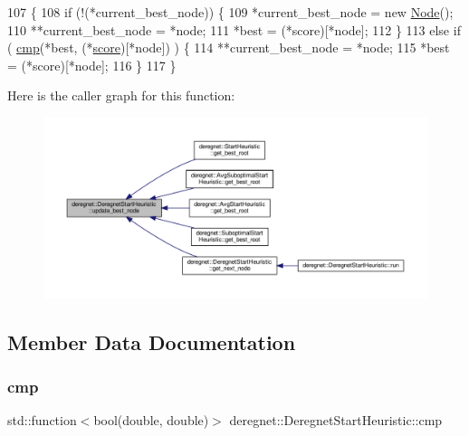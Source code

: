 \begin{DoxyCode}
107                                                             \{
108     \textcolor{keywordflow}{if} (!(*current\_best\_node)) \{
109         *current\_best\_node = \textcolor{keyword}{new} \hyperlink{namespacederegnet_a744bad34f2de9856d36715a445f027f3}{Node}();
110         **current\_best\_node = *node;
111         *best = (*score)[*node];
112     \}
113     \textcolor{keywordflow}{else} \textcolor{keywordflow}{if} ( \hyperlink{classderegnet_1_1DeregnetStartHeuristic_aa5af4d29e3b276c0046c997c16cca3a1}{cmp}(*best, (*\hyperlink{classderegnet_1_1DeregnetStartHeuristic_ae03300e79482975e98f95cba19ad32b0}{score})[*node]) ) \{
114         **current\_best\_node = *node;
115         *best = (*score)[*node];
116     \}
117 \}
\end{DoxyCode}
Here is the caller graph for this function\+:\nopagebreak
\begin{figure}[H]
\begin{center}
\leavevmode
\includegraphics[width=350pt]{classderegnet_1_1DeregnetStartHeuristic_a50179ff9db4d416b93ff41d1dcee1358_icgraph}
\end{center}
\end{figure}


\subsection{Member Data Documentation}
\mbox{\label{classderegnet_1_1DeregnetStartHeuristic_aa5af4d29e3b276c0046c997c16cca3a1}} 
\subsubsection{\texorpdfstring{cmp}{cmp}}
{\footnotesize\ttfamily std\+::function$<$bool(double, double)$>$ deregnet\+::\+Deregnet\+Start\+Heuristic\+::cmp\hspace{0.3cm}{\ttfamily [protected]}}



